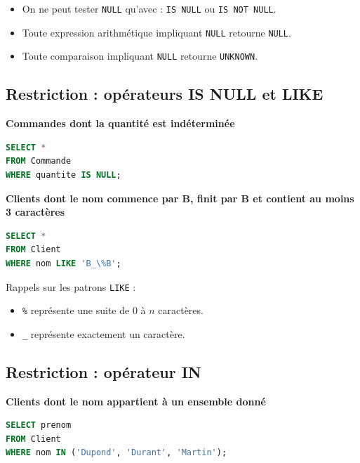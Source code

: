 \begin{itemize}
    \item On ne peut tester \texttt{NULL} qu’avec : \texttt{IS NULL} ou \texttt{IS NOT NULL}.
    \item Toute expression arithmétique impliquant \texttt{NULL} retourne \texttt{NULL}.
    \item Toute comparaison impliquant \texttt{NULL} retourne \texttt{UNKNOWN}.
\end{itemize}

\subsection{Restriction : opérateurs IS NULL et LIKE}

\textbf{Commandes dont la quantité est indéterminée}

\begin{sqlcodebox}
\begin{lstlisting}[language=SQL]
SELECT *
FROM Commande
WHERE quantite IS NULL;
\end{lstlisting}
\end{sqlcodebox}

\textbf{Clients dont le nom commence par B, finit par B et contient au moins 3 caractères}

\begin{sqlcodebox}
\begin{lstlisting}[language=SQL]
SELECT *
FROM Client
WHERE nom LIKE 'B_\%B';
\end{lstlisting}
\end{sqlcodebox}

Rappels sur les patrons \texttt{LIKE} :

\begin{itemize}
    \item \texttt{\%} représente une suite de 0 à $n$ caractères.
    \item \texttt{\_} représente exactement un caractère.
\end{itemize}

\subsection{Restriction : opérateur IN}

 \textbf{Clients dont le nom appartient à un ensemble donné}

\begin{sqlcodebox}
\begin{lstlisting}[language=SQL]
SELECT prenom
FROM Client
WHERE nom IN ('Dupond', 'Durant', 'Martin');
\end{lstlisting}
\end{sqlcodebox}

